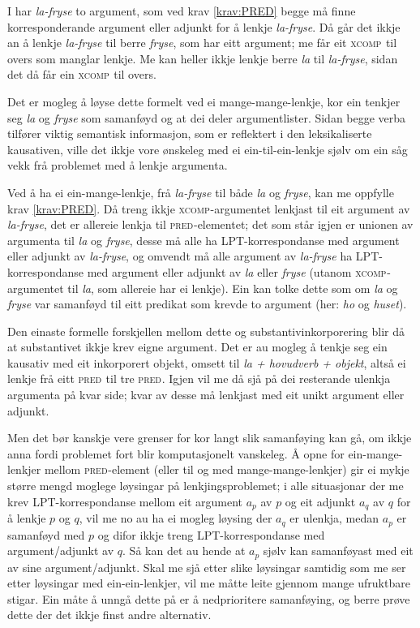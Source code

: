 \documentclass[11pt,a4paper,oneside,draft]{book}
\newcommand{\F}[2]{\textsc{#1}\ensuremath{_{#2}}}
\newcommand{\XCOMP}{\F{xcomp}{}}
\newcommand{\PRED}{\F{pred}{}}
\begin{document}
I \Last har \emph{la-fryse} to argument, som ved krav \ref{krav:PRED} begge
må finne korresponderande argument eller adjunkt for å lenkje \emph{la-fryse}. 
Då går det ikkje an å lenkje \emph{la-fryse} til berre \emph{fryse},
som har eitt argument; me får eit \XCOMP{} til overs som manglar
lenkje. Me kan heller ikkje lenkje berre \emph{la} til \emph{la-fryse}, sidan
det då får ein \XCOMP{} til overs.

Det er mogleg å løyse dette formelt ved ei mange-mange-lenkje, kor ein
tenkjer seg \emph{la} og \emph{fryse} som samanføyd og at dei deler
argumentlister. Sidan begge verba tilfører viktig semantisk
informasjon, som er reflektert i den leksikaliserte kausativen, ville
det ikkje vore ønskeleg med ei ein-til-ein-lenkje sjølv om ein såg
vekk frå problemet med å lenkje argumenta.

Ved å ha ei ein-mange-lenkje, frå \emph{la-fryse} til både \emph{la} og \emph{fryse},
kan me oppfylle krav \ref{krav:PRED}. Då treng ikkje
\XCOMP{}-argumentet lenkjast til eit argument av \emph{la-fryse}, det er
allereie lenkja til \PRED{}-elementet; det som står igjen er unionen av
argumenta til \emph{la} og \emph{fryse}, desse må alle ha LPT-korrespondanse med
argument eller adjunkt av \emph{la-fryse}, og omvendt må alle argument av \emph{la-fryse} 
ha LPT-korrespondanse med argument eller adjunkt av \emph{la}
eller \emph{fryse} (utanom \XCOMP{}-argumentet til \emph{la}, som allereie har ei
lenkje). Ein kan tolke dette som om \emph{la} og \emph{fryse} var samanføyd til
eitt predikat som krevde to argument (her: \emph{ho} og \emph{huset}).

Den einaste formelle forskjellen mellom dette og
substantivinkorporering blir då at substantivet ikkje krev eigne
argument. Det er au mogleg å tenkje seg ein kausativ med eit
inkorporert objekt, omsett til \emph{la + hovudverb + objekt}, altså ei
lenkje frå eitt \PRED{} til tre \PRED{}. Igjen vil me då sjå på dei resterande
ulenkja argumenta på kvar side; kvar av desse må lenkjast med eit
unikt argument eller adjunkt.

Men det bør kanskje vere grenser for kor langt slik samanføying kan
gå, om ikkje anna fordi problemet fort blir komputasjonelt
vanskeleg. Å opne for ein-mange-lenkjer mellom \PRED{}-element (eller til
og med mange-mange-lenkjer) gir ei mykje større mengd moglege
løysingar på lenkjingsproblemet; i alle situasjonar der me krev
LPT-korrespondanse mellom eit argument $a_p$ av $p$ og eit adjunkt
$a_q$ av $q$ for å lenkje $p$ og $q$, vil me no au ha ei mogleg
løysing der $a_q$ er ulenkja, medan $a_p$ er samanføyd med $p$ og
difor ikkje treng LPT-korrespondanse med argument/adjunkt av $q$. Så
kan det au hende at $a_p$ sjølv kan samanføyast med eit av sine
argument/adjunkt. Skal me sjå etter slike løysingar samtidig som me
ser etter løysingar med ein-ein-lenkjer, vil me måtte leite gjennom
mange ufruktbare stigar. Ein måte å unngå dette på er å nedprioritere
samanføying, og berre prøve dette der det ikkje finst andre
alternativ.
\end{document}
